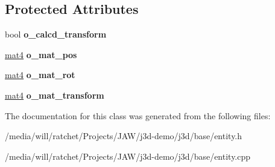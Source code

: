 \subsection*{Protected Attributes}
\begin{DoxyCompactItemize}
\item 
\hypertarget{classj3d_1_1base_1_1Entity_a2da3753e152c17949b1af766a4fc794a}{}bool {\bfseries o\+\_\+calcd\+\_\+transform}\label{classj3d_1_1base_1_1Entity_a2da3753e152c17949b1af766a4fc794a}

\item 
\hypertarget{classj3d_1_1base_1_1Entity_a02635cd84b33407363b5a175b950c923}{}\hyperlink{structj3d_1_1mat4}{mat4} {\bfseries o\+\_\+mat\+\_\+pos}\label{classj3d_1_1base_1_1Entity_a02635cd84b33407363b5a175b950c923}

\item 
\hypertarget{classj3d_1_1base_1_1Entity_a7f5bd24ac230e1a7c43b340f213b5b8a}{}\hyperlink{structj3d_1_1mat4}{mat4} {\bfseries o\+\_\+mat\+\_\+rot}\label{classj3d_1_1base_1_1Entity_a7f5bd24ac230e1a7c43b340f213b5b8a}

\item 
\hypertarget{classj3d_1_1base_1_1Entity_a09ebbab0c0ecf5575bc55707d5edfcaa}{}\hyperlink{structj3d_1_1mat4}{mat4} {\bfseries o\+\_\+mat\+\_\+transform}\label{classj3d_1_1base_1_1Entity_a09ebbab0c0ecf5575bc55707d5edfcaa}

\end{DoxyCompactItemize}


The documentation for this class was generated from the following files\+:\begin{DoxyCompactItemize}
\item 
/media/will/ratchet/\+Projects/\+J\+A\+W/j3d-\/demo/j3d/base/entity.\+h\item 
/media/will/ratchet/\+Projects/\+J\+A\+W/j3d-\/demo/j3d/base/entity.\+cpp\end{DoxyCompactItemize}
